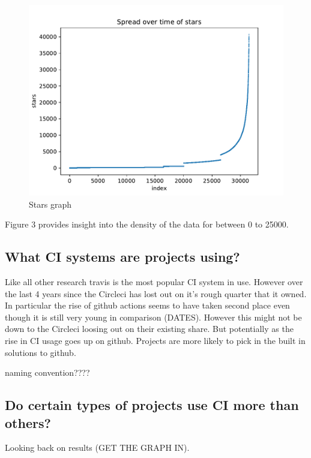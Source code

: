 \documentclass[twoside,12pt,titlepage,a4paper]{article}
\begin{document}
\begin{figure}[!htbp]
  \centering
  \includegraphics[width=\textwidth]{../src/results/spread over time.pdf}
  \caption[alt text]{Stars graph}
\end{figure}

Figure 3 provides insight into the density of the data for between 0 to 25000.

\vspace*{-0.05in}
\subsection{What CI systems are projects using?}
\vspace*{-0.05in}
Like all other research travis is the most popular CI system in use. However over the last 4 years since the \cite{Github2017} Circleci has lost out on it's rough quarter that it owned. In particular the rise of github actions seems to have taken second place even though it is still very young in comparison (DATES). However this might not be down to the Circleci loosing out on their existing share. But potentially as the rise in CI usage goes up on github. Projects are more likely to pick in the built in solutions to github.


naming convention????




\vspace*{-0.05in}
\subsection{Do certain types of projects use CI more than others?}
\vspace*{-0.05in}
Looking back on \cite{Hilton2016} results (GET THE GRAPH IN).
\end{document}
